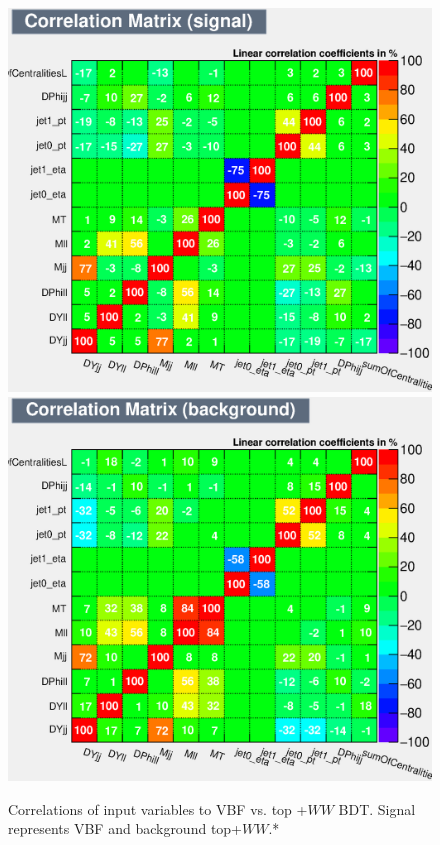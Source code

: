\begin{figure}[!htbp]
  \centering
  \includegraphics[width=.6\linewidth]{Pictures/VBFvsWW+Top/CorrelationMatrixS.eps}
  \includegraphics[width=.6\linewidth]{Pictures/VBFvsWW+Top/CorrelationMatrixB.eps}
\caption{Correlations of input variables to VBF vs. top +$WW$ BDT. Signal represents VBF and background top+$WW$.*}
\label{fig:SRcorrSB}
\end{figure}
